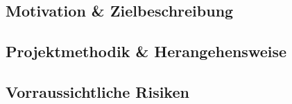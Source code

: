 \documentclass[../main.tex]{subfiles}
\begin{document}
\subsection{Motivation \& Zielbeschreibung}

\subsection{Projektmethodik \& Herangehensweise}

\subsection{Vorraussichtliche Risiken}
\end{document}

